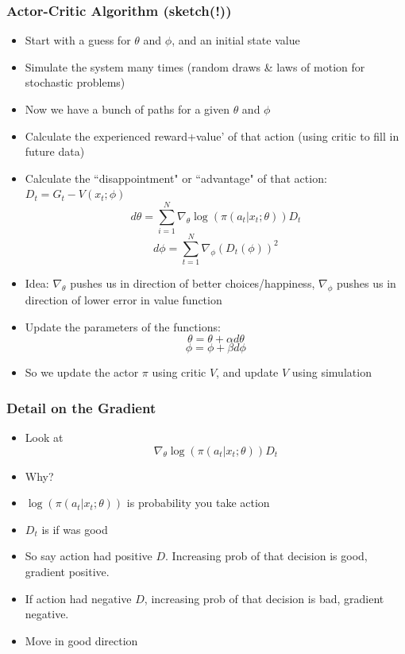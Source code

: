 \documentclass{beamer}
\begin{document}
\begin{frame}
\frametitle[alignment=center]{Actor-Critic Algorithm (\textbf{sketch(!)})}
\begin{itemize}
\footnotesize
\item Start with a guess for $\theta$ and $\phi$, and an initial state value
\item Simulate the system many times (random draws \& laws of motion for stochastic problems)
\item Now we have a bunch of paths for a given $\theta$ and $\phi$
\item Calculate the experienced reward+value' of that action (using critic to fill in future data)
\item Calculate the ``disappointment" or ``advantage" of that action: $D_t=G_t-V(x_t;\phi)$
$$d\theta=\sum_{i=1}^N\nabla_{\theta}\log(\pi(a_t|x_t;\theta))D_t$$
$$d\phi=\sum_{t=1}^N\nabla_{\phi}(D_t(\phi))^2$$
\item Idea:  $\nabla_{\theta}$ pushes us in direction of better choices/happiness, $\nabla_{\phi}$ pushes us in direction of lower error in value function
\item Update the parameters of the functions:
$$\theta=\theta+\alpha d\theta$$
$$\phi=\phi+\beta d\phi$$
\item So we update the actor $\pi$ using critic $V$, and update $V$ using simulation
\end{itemize}
\end{frame}


\begin{frame}
\frametitle[alignment=center]{Detail on the Gradient}
\begin{itemize}
\item Look at
$$\nabla_{\theta}\log(\pi(a_t|x_t;\theta))D_t$$
\item Why?
\item $\log(\pi(a_t|x_t;\theta))$ is probability you take action
\item $D_t$ is if was good
\item So say action had positive $D$. Increasing prob of that decision is good, gradient positive.
\item If action had negative $D$, increasing prob of that decision is bad, gradient negative.
\item Move in good direction
\end{itemize}
\end{frame}
\end{document}
